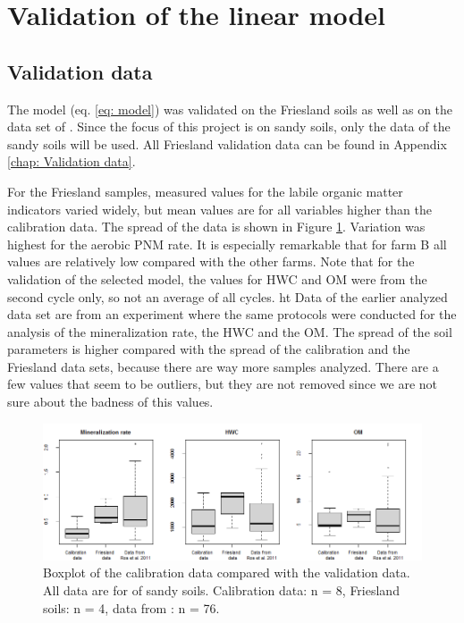\documentclass[10pt,twoside,dutch,english]{report}
\begin{document}
\section{Validation of the linear model}
\subsection{Validation data}
The model (eq. \ref{eq: model}) was validated on the Friesland soils as well as on the data set of \citet{Ros2011}. Since the focus of this project is on sandy soils, only the data of the sandy soils will be used. All Friesland validation data can be found in Appendix \ref{chap: Validation data}.

For the Friesland samples, measured values for the labile organic matter indicators varied widely, but mean values are for all variables higher than the calibration data. The spread of the data is shown in Figure \ref{fig:results_val_data}.  Variation was highest for the aerobic PNM rate. It is especially remarkable that for farm B all values are relatively low compared with the other farms. 
Note that for the validation of the selected model, the values for HWC and OM were from the second cycle only, so not an average of all cycles. 
ht
Data of the earlier analyzed data set are from an experiment where the same protocols were conducted for the analysis of the mineralization rate, the HWC and the OM. The spread of the soil parameters is higher compared with the spread of the calibration and the Friesland data sets, because there are way more samples analyzed. There are a few values that seem to be outliers, but they are not removed since we are not sure about the badness of this values.

	\begin{figure}[ht] %
		
		\centering
		\includegraphics[width=1\linewidth]{results_val_data}
		\caption{Boxplot of the calibration data compared with the validation data. All data are for of sandy soils. Calibration data: n = 8, Friesland soils: n = 4, data from \citet{Ros2011}: n = 76.}
		\label{fig:results_val_data}
	\end{figure}
\end{document}
